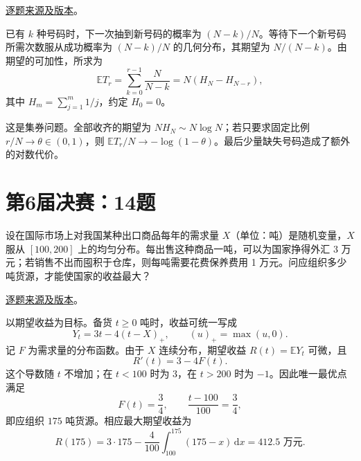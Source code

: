 \documentclass[UTF8,12pt,a4paper,fontset=fandol]{ctexbook}
\begin{document}
\href{https://github.com/lzxcr/cmc-mathematics/blob/64916fa1fdbc3e444a652eca204d5669058ee321/src/problems/finals/05/10.md}{逐题来源及版本}。

\begin{solve}

已有 $k$ 种号码时，下一次抽到新号码的概率为 $(N-k)/N$。等待下一个新号码所需次数服从成功概率为 $(N-k)/N$ 的几何分布，其期望为 $N/(N-k)$。由期望的可加性，所求为
\[
\mathbb E T_r=\sum_{k=0}^{r-1}\frac{N}{N-k}
=N(H_N-H_{N-r}),
\]
其中 $H_m=\sum_{j=1}^m1/j$，约定 $H_0=0$。

\end{solve}

\begin{remark}[方法与条件]

这是集券问题。全部收齐的期望为 $NH_N\sim N\log N$；若只要求固定比例 $r/N\to\theta\in(0,1)$，则 $\mathbb E T_r/N\to-\log(1-\theta)$。最后少量缺失号码造成了额外的对数代价。

\end{remark}

\section{第6届决赛：14题}\label{pr:fin06-hi:14}

\begin{example}[公开题解转录]\label{q:fin06-hi:14}

设在国际市场上对我国某种出口商品每年的需求量 $X$（单位：吨）是随机变量，$X$ 服从 $[100,200]$ 上的均匀分布。每出售这种商品一吨，可以为国家挣得外汇 3 万元；若销售不出而囤积于仓库，则每吨需要花费保养费用 1 万元。问应组织多少吨货源，才能使国家的收益最大？

\end{example}

\href{https://github.com/lzxcr/cmc-mathematics/blob/64916fa1fdbc3e444a652eca204d5669058ee321/src/problems/finals/06/15.md}{逐题来源及版本}。

\begin{solve}

以期望收益为目标。备货 $t\ge0$ 吨时，收益可统一写成
\[
Y_t=3t-4(t-X)_+,
\qquad (u)_+=\max(u,0).
\]
记 $F$ 为需求量的分布函数。由于 $X$ 连续分布，期望收益 $R(t)=\mathbb EY_t$ 可微，且
\[
R'(t)=3-4F(t).
\]
这个导数随 $t$ 不增加；在 $t<100$ 时为 $3$，在 $t>200$ 时为 $-1$。因此唯一最优点满足
\[
F(t)=\frac34,
\qquad \frac{t-100}{100}=\frac34,
\]
即应组织 $\boxed{175}$ 吨货源。相应最大期望收益为
\[
R(175)=3\cdot175-\frac4{100}\int_{100}^{175}(175-x)\,\mathrm dx
=412.5\text{ 万元}.
\]

\end{solve}
\end{document}

